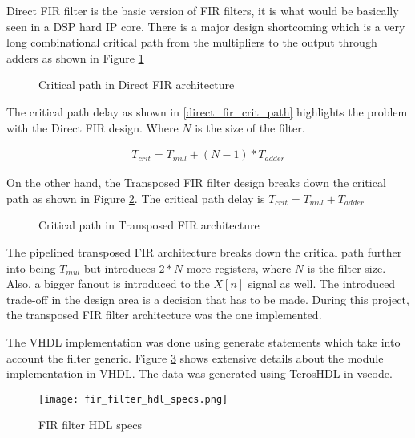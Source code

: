 Direct FIR filter is the basic version of FIR filters, it is what would be basically seen in a DSP hard IP core. There is a major design shortcoming which is a very long combinational critical path from the multipliers to the output through adders as shown in Figure \ref{fig:direct_fir_filter_architectures_crit_path}


\begin{figure}[h]
    \centering
    
    \caption{Critical path in Direct FIR architecture}
    \label{fig:direct_fir_filter_architectures_crit_path}
\end{figure}

The critical path delay as shown in \eqref{direct_fir_crit_path} highlights the problem with the Direct FIR design. Where $N$ is the size of the filter.


\begin{equation}\label{direct_fir_crit_path}
    \begin{aligned}
        T_{crit} = T_{mul} + (N-1) * T_{adder}
    \end{aligned}
\end{equation}

On the other hand, the Transposed FIR filter design breaks down the critical path as shown in Figure \ref{fig:transposed_fir_filter_architectures_crit_path}. The critical path delay is $T_{crit} = T_{mul} + T_{adder}$


\begin{figure}[h]
    \centering
    
    \caption{Critical path in Transposed FIR architecture}
    \label{fig:transposed_fir_filter_architectures_crit_path}
\end{figure}


The pipelined transposed FIR architecture breaks down the critical path further into being $T_{mul}$ but introduces $2*N$ more registers, where $N$ is the filter size. Also, a bigger fanout is introduced to the $X[n]$ signal as well. The introduced trade-off in the design area is a decision that has to be made. During this project, the transposed FIR filter architecture was the one implemented.

The VHDL implementation was done using generate statements which take into account the filter generic. Figure \ref{fig:fir_filter_hdl_specs} shows extensive details about the module implementation in VHDL. The data was generated using TerosHDL in vscode.


\begin{figure}[h]
    \centering
    \texttt{[image: fir\_filter\_hdl\_specs.png]}
    \caption{FIR filter HDL specs}
    \label{fig:fir_filter_hdl_specs}
\end{figure}

